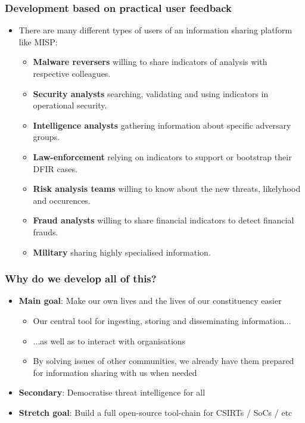 \begin{frame}
\frametitle{Development based on practical user feedback}
\begin{itemize}
\item There are many different types of users of an information sharing platform like MISP:
        \begin{itemize}
                \item {\bf Malware reversers} willing to share indicators of analysis with respective colleagues.
                \item {\bf Security analysts} searching, validating and using indicators in operational security.
                \item {\bf Intelligence analysts} gathering information about specific adversary groups.
                \item {\bf Law-enforcement} relying on indicators to support or bootstrap their DFIR cases.
                \item {\bf Risk analysis teams} willing to know about the new threats, likelyhood and occurences.
                \item {\bf Fraud analysts} willing to share financial indicators to detect financial frauds.
                \item {\bf Military} sharing highly specialised information.
        \end{itemize}
\end{itemize}
\end{frame}

        
\begin{frame}
\frametitle{Why do we develop all of this?}      
\begin{itemize}
   \item {\bf Main goal}: Make our own lives and the lives of our constituency easier
   \begin{itemize}
       \item Our central tool for ingesting, storing and disseminating information...
       \item ...as well as to interact with organisations
       \item By solving issues of other communities, we already have them prepared for information sharing with us when needed
   \end{itemize}
   \item {\bf Secondary}: Democratise threat intelligence for all
   \item {\bf Stretch goal}: Build a full open-source tool-chain for CSIRTs / SoCs / etc
\end{itemize}
\end{frame}

